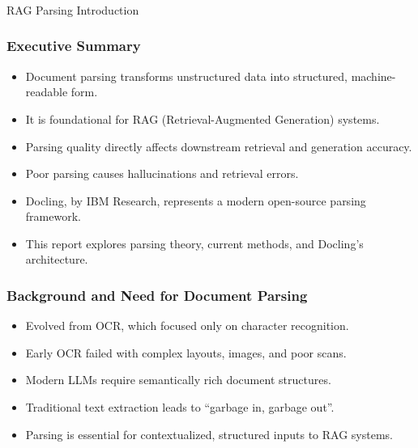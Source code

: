 \begin{frame}[fragile]\frametitle{}
\begin{center}
{\Large RAG Parsing Introduction}

\end{center}
\end{frame}


\begin{frame}[fragile]\frametitle{Executive Summary}
      \begin{itemize}
        \item Document parsing transforms unstructured data into structured, machine-readable form.
        \item It is foundational for RAG (Retrieval-Augmented Generation) systems.
        \item Parsing quality directly affects downstream retrieval and generation accuracy.
        \item Poor parsing causes hallucinations and retrieval errors.
        \item Docling, by IBM Research, represents a modern open-source parsing framework.
        \item This report explores parsing theory, current methods, and Docling’s architecture.
      \end{itemize}
\end{frame}

\begin{frame}[fragile]\frametitle{Background and Need for Document Parsing}
      \begin{itemize}
        \item Evolved from OCR, which focused only on character recognition.
        \item Early OCR failed with complex layouts, images, and poor scans.
        \item Modern LLMs require semantically rich document structures.
        \item Traditional text extraction leads to “garbage in, garbage out”.
        \item Parsing is essential for contextualized, structured inputs to RAG systems.
      \end{itemize}
\end{frame}

